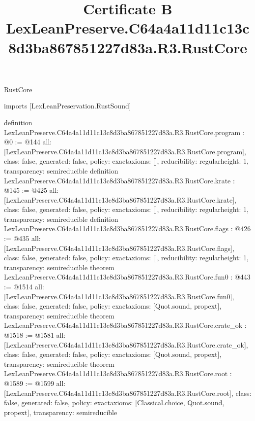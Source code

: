 \begin{lexlean}{RustCore}
\title{Certificate B LexLeanPreserve.C64a4a11d11c13c8d3ba867851227d83a.R3.RustCore}
\begin{coremodule}
imports [LexLeanPreservation.RustSound]

definition LexLeanPreserve.C64a4a11d11c13c8d3ba867851227d83a.R3.RustCore.program : @0 := @144 {
  all: [LexLeanPreserve.C64a4a11d11c13c8d3ba867851227d83a.R3.RustCore.program],
  class: false,
  generated: false,
  policy: exact{axioms: []},
  reducibility: regular{height: 1},
  transparency: semireducible
}
definition LexLeanPreserve.C64a4a11d11c13c8d3ba867851227d83a.R3.RustCore.krate : @145 := @425 {
  all: [LexLeanPreserve.C64a4a11d11c13c8d3ba867851227d83a.R3.RustCore.krate],
  class: false,
  generated: false,
  policy: exact{axioms: []},
  reducibility: regular{height: 1},
  transparency: semireducible
}
definition LexLeanPreserve.C64a4a11d11c13c8d3ba867851227d83a.R3.RustCore.flags : @426 := @435 {
  all: [LexLeanPreserve.C64a4a11d11c13c8d3ba867851227d83a.R3.RustCore.flags],
  class: false,
  generated: false,
  policy: exact{axioms: []},
  reducibility: regular{height: 1},
  transparency: semireducible
}
theorem LexLeanPreserve.C64a4a11d11c13c8d3ba867851227d83a.R3.RustCore.fun0 : @443 := @1514 {
  all: [LexLeanPreserve.C64a4a11d11c13c8d3ba867851227d83a.R3.RustCore.fun0],
  class: false,
  generated: false,
  policy: exact{axioms: [Quot.sound, propext]},
  transparency: semireducible
}
theorem LexLeanPreserve.C64a4a11d11c13c8d3ba867851227d83a.R3.RustCore.crate_ok : @1518 := @1581 {
  all: [LexLeanPreserve.C64a4a11d11c13c8d3ba867851227d83a.R3.RustCore.crate_ok],
  class: false,
  generated: false,
  policy: exact{axioms: [Quot.sound, propext]},
  transparency: semireducible
}
theorem LexLeanPreserve.C64a4a11d11c13c8d3ba867851227d83a.R3.RustCore.root : @1589 := @1599 {
  all: [LexLeanPreserve.C64a4a11d11c13c8d3ba867851227d83a.R3.RustCore.root],
  class: false,
  generated: false,
  policy: exact{axioms: [Classical.choice, Quot.sound, propext]},
  transparency: semireducible
}


\end{coremodule}
\end{lexlean}
